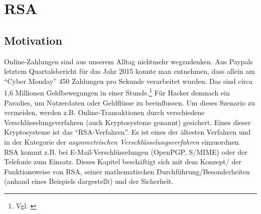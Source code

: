 \author{Autor: Patrick Künzl}
\chapter{\ac{RSA}}
\section{Motivation}
Online-Zahlungen sind aus unserem Alltag nichtmehr wegzudenken. Aus Paypals
letztem Quartalsbericht für das Jahr 2015 konnte man entnehmen, dass allein am
"`Cyber Monday"' 450 Zahlungen pro Sekunde verarbeitet wurden. Das sind circa
1,6 Millionen Geldbewegungen in einer Stunde.\footnote{Vgl. \citet{MotleyFool}}
Für Hacker demnach ein Paradies, um Nutzerdaten oder Geldflüsse zu beeinflussen.
Um dieses Szenario zu vermeiden, werden z.B. Online-Transaktionen durch
verschiedene Verschlüsselungsverfahren (auch Kryptosysteme genannt) gesichert.
Eines dieser Kryptosysteme ist das "`RSA-Verfahren"'. Es ist eines der
ältesten Verfahren und in der Kategorie der \emph{asymmetrischen
Verschlüsselungsverfahren} einzuordnen. RSA kommt z.B.
bei E-Mail-Verschlüsselungen (OpenPGP, S/MIME) oder der Telefonie zum Einsatz.
Dieses Kapitel beschäftigt sich mit dem Konzept/ der Funktionsweise von RSA,
seiner mathematischen Durchführung/Besonderheiten (anhand eines Beispiels
dargestellt) und der Sicherheit.
